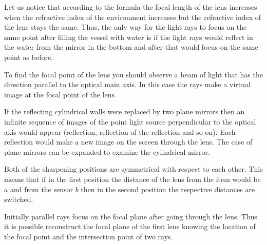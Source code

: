 \documentclass[11pt]{article}
\begin{document}

\hinteng
Let us notice that according to the formula the focal length of the lens increases when the refractive index of the environment increases but the refractive index of the lens stays the same. Thus, the only way for the light rays to focus on the same point after filling the vessel with water is if the light rays would reflect in the water from the mirror in the bottom and after that would focus on the same point as before.
\probend
\bigskip


\hinteng
To find the focal point of the lens you should observe a beam of light that has the direction parallel to the optical main axis. In this case the rays make a virtual image at the focal point of the lens.
\probend
\bigskip


\hinteng
If the reflecting cylindrical walls were replaced by two plane mirrors then an infinite sequence of images of the point light source perpendicular to the optical axis would appear (reflection, reflection of the reflection and so on). Each reflection would make a new image on the screen through the lens. The case of plane mirrors can be expanded to examine the cylindrical mirror.
\probend
\bigskip


\hinteng
Both of the sharpening positions are symmetrical with respect to each other. This means that if in the first position the distance of the lens from the item would be $a$ and from the sensor $b$ then in the second position the respective distances are switched.
\probend
\bigskip


\hinteng
Initially parallel rays focus on the focal plane after going through the lens. Thus it is possible reconstruct the focal plane of the first lens knowing the location of the focal point and the intersection point of two rays.
\probend
\bigskip
\end{document}
